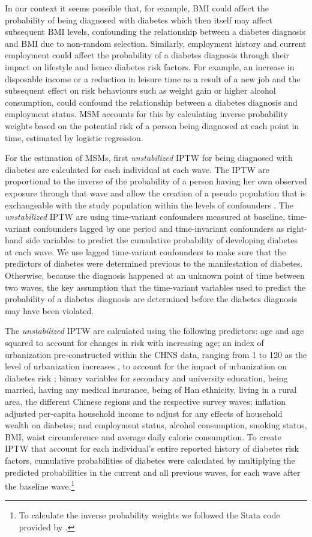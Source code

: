 In our context it seems possible that, for example, \ac{BMI} could affect the probability of being diagnosed with diabetes which then itself may affect subsequent \ac{BMI} levels, confounding the relationship between a diabetes diagnosis and \ac{BMI} due to non-random selection. Similarly, employment history and current employment could affect the probability of a diabetes diagnosis through their impact on lifestyle and hence diabetes risk factors. For example, an increase in disposable income or a reduction in leisure time as a result of a new job and the subsequent effect on risk behaviours such as weight gain or higher alcohol consumption, could confound the relationship between a diabetes diagnosis and employment status. \ac{MSM} accounts for this by calculating inverse probability weights based on the potential risk of a person being diagnosed at each point in time, estimated by logistic regression. 

For the estimation of \acp{MSM}, first \textit{unstabilized} \ac{IPTW} for being diagnosed with diabetes are calculated for each individual at each wave. The \ac{IPTW} are proportional to the inverse of the probability of a person having her own observed exposure through that wave and allow the creation of a pseudo population that is exchangeable with the study population within the levels of confounders \parencite{Cole2008}. The \textit{unstabilized} \ac{IPTW} are using time-variant confounders measured at baseline, time-variant confounders lagged by one period and time-invariant confounders as right-hand side variables to predict the cumulative probability of developing diabetes at each wave. We use lagged time-variant confounders to make sure that the predictors of diabetes were determined previous to the manifestation of diabetes. Otherwise, because the diagnosis happened at an unknown point of time between two waves, the key assumption that the time-variant variables used to predict the probability of a diabetes diagnosis are determined before the diabetes diagnosis may have been violated. 

The \textit{unstabilized} \ac{IPTW} are calculated using the following predictors: age and age squared to account for changes in risk with increasing age; an index of urbanization pre-constructed within the \ac{CHNS} data, ranging from 1 to 120 as the level of urbanization increases \parencite{Zhang2014d}, to account for the impact of urbanization on diabetes risk \parencite{Attard2012}; binary variables for secondary and university education, being married, having any medical insurance, being of Han ethnicity, living in a rural area, the different Chinese regions and the respective survey waves; inflation adjusted per-capita household income to adjust for any effects of household wealth on diabetes; and employment status, alcohol consumption, smoking status, \ac{BMI}, waist circumference and average daily calorie consumption. To create \ac{IPTW} that account for each individual's entire reported history of diabetes risk factors, cumulative probabilities of diabetes were calculated by multiplying the predicted probabilities in the current and all previous waves, for each wave after the baseline wave.\footnote{To calculate the inverse probability weights we followed the Stata code provided by \textcite{Fewell2004}.}


